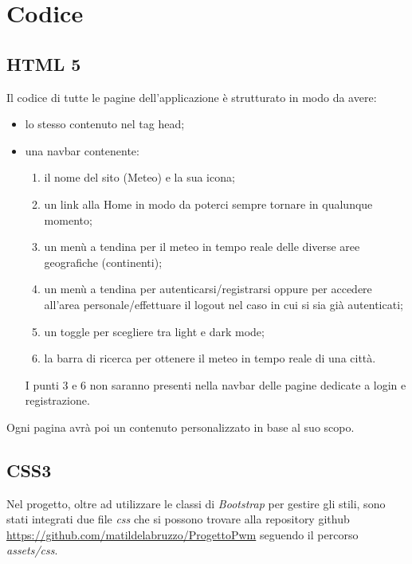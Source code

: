 \chapter{Codice}

\section{HTML 5}

Il codice di tutte le pagine dell'applicazione è strutturato in modo da avere:
\begin{itemize}
    \item lo stesso contenuto nel tag head;
    \item una navbar contenente:
          \begin{enumerate}
              \item il nome del sito (Meteo) e la sua icona;
              \item un link alla Home in modo da poterci sempre tornare in qualunque momento;
              \item un menù a tendina per il meteo in tempo reale delle diverse aree geografiche (continenti);
              \item un menù a tendina per autenticarsi/registrarsi oppure per accedere all'area personale/effettuare
                    il logout nel caso in cui si sia già autenticati;
              \item un toggle per scegliere tra light e dark mode;
              \item la barra di ricerca per ottenere il meteo in tempo reale di una città.
          \end{enumerate}
          I punti 3 e 6 non saranno presenti nella navbar delle pagine dedicate a login e registrazione.
\end{itemize}

\vspace{5mm}

Ogni pagina avrà poi un contenuto personalizzato in base al suo scopo.

\section{CSS3}

Nel progetto, oltre ad utilizzare le classi di \emph{Bootstrap} per gestire gli stili, sono stati integrati due file \emph{css} che si possono trovare alla repository github
\url{https://github.com/matildelabruzzo/ProgettoPwm} seguendo il percorso \emph{assets/css}.

